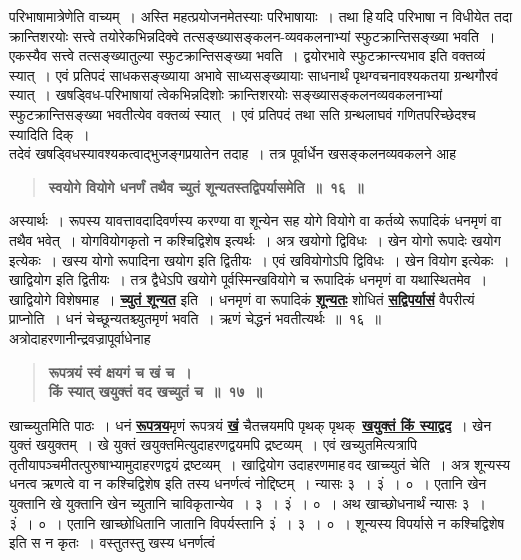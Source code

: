 \documentclass[11pt, openany]{book}
\begin{document}
\newpage

\begin{sloppypar}
\noindent परिभाषामात्रेणेति वाच्यम्~। अस्ति महत्प्रयोजनमेतस्याः परिभाषायाः~। तथा हि\textendash \,यदि परिभाषा न विधीयेत तदा क्रान्तिशरयोः सत्त्वे तयोरेकभिन्नदिक्वे तत्सङ्ख्यासङ्कलन-व्यवकलनाभ्यां स्फुटक्रान्तिसङ्ख्या भवति~। एकस्यैव सत्त्वे तत्सङ्ख्यातुल्या स्फुटक्रान्तिसङ्ख्या भवति~। द्वयोरभावे स्फुटक्रान्त्यभाव इति वक्तव्यं स्यात्~। एवं प्रतिपदं साधकसङ्ख्याया अभावे साध्यसङ्ख्यायाः साधनार्थं पृथग्वचनावश्यकतया ग्रन्थगौरवं स्यात्~। खषड्विध-परिभाषायां त्वेकभिन्नदिशोः क्रान्तिशरयोः सङ्ख्यासङ्कलनव्यवकलनाभ्यां स्फुटक्रान्तिसङ्ख्या भवतीत्येव वक्तव्यं स्यात्~। एवं प्रतिपदं तथा सति ग्रन्थलाघवं गणितपरिच्छेदश्च स्यादिति दिक्~।\\

{\small तदेवं खषड्विधस्यावश्यकत्वाद्भुजङ्गप्रयातेन तदाह~। तत्र पूर्वार्धेन खसङ्कलनव्यवकलने आह\textendash }

 \label{2.16}
\begin{quote}
{\large \textbf{{\color{purple}स्वयोगे वियोगे धनर्णं तथैव च्युतं शून्यतस्तद्विपर्यासमेति~॥~१६~॥}}}
\end{quote}

अस्यार्थः~। रूपस्य यावत्तावदादिवर्णस्य करण्या वा शून्येन सह योगे वियोगे वा कर्तव्ये रूपादिकं धनमृणं वा तथैव भवेत्~। योगवियोगकृतो न कश्चिद्विशेष इत्यर्थः~। अत्र खयोगो द्विविधः~। खेन योगो रूपादेः खयोग इत्येकः~। खस्य योगो रूपादिना खयोग इति द्वितीयः~। एवं खवियोगोऽपि द्विविधः~। खेन वियोग इत्येकः~। खाद्वियोग इति द्वितीयः~। तत्र द्वैधेऽपि खयोगे पूर्वस्मिन्खवियोगे च रूपादिकं धनमृणं वा यथास्थितमेव~। खाद्वियोगे विशेषमाह~। \hyperref[2.16]{\textbf{च्युतं शून्यत}} इति~। धनमृणं वा रूपादिकं \hyperref[2.16]{\textbf{शून्यतः}} शोधितं \hyperref[2.16]{\textbf{सद्विपर्यासं}} वैपरीत्यं प्राप्नोति~। धनं चेच्छून्यतश्च्युतमृणं भवति~। ऋणं चेद्धनं भवतीत्यर्थः~॥~१६~॥\\

{\small अत्रोदाहरणानीन्द्रवज्रापूर्वाधेनाह\textendash }

 \label{2.17}
\begin{quote}
{\large \textbf{{\color{purple}रूपत्रयं स्वं क्षयगं च खं च~।\\
किं स्यात् खयुक्तं वद खच्युतं च~॥~१७~॥}}}
\end{quote}

खाच्च्युतमिति पाठः~। धनं \hyperref[2.17]{\textbf{रूपत्रय}}मृणं रूपत्रयं \hyperref[2.17]{\textbf{खं}} चैतत्त्रयमपि पृथक् पृथक्~\hyperref[2.17]{\textbf{खयुक्तं किं स्याद्वद}}~। खेन युक्तं खयुक्तम्~। खे युक्तं खयुक्तमित्युदाहरणद्वयमपि द्रष्टव्यम्~। एवं खच्युतमित्यत्रापि तृतीयापञ्चमीतत्पुरुषाभ्यामुदाहरणद्वयं द्रष्टव्यम्~। खाद्वियोग उदाहरणमाह\textendash \,वद खाच्च्युतं चेति~। अत्र शून्यस्य धनत्व ऋणत्वे वा न कश्चिद्विशेष इति तस्य धनर्णत्वं नोद्दिष्टम्~। न्यासः ३~। ३ं~। ०~। एतानि खेन युक्तानि खे युक्तानि खेन च्युतानि चाविकृतान्येव~। ३~। ३ं~। ०~। अथ खाच्छोधनार्थं न्यासः ३~। ३ं~। ०~। एतानि खाच्छोधितानि जातानि विपर्यस्तानि ३ं~। ३~। ०~। शून्यस्य विपर्यासे न कश्चिद्विशेष इति स न कृतः~। वस्तुतस्तु खस्य धनर्णत्वं
\end{sloppypar}
\end{document}
